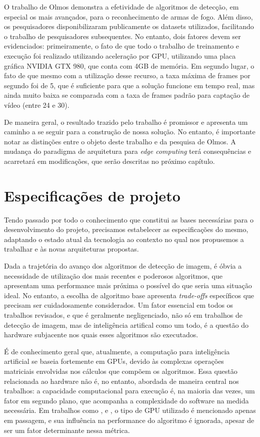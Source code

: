 \documentclass[]{politex}
\begin{document}
O trabalho de Olmos demonstra a efetividade de algoritmos de detecção, em especial os mais avançados, para o reconhecimento de armas de fogo. Além disso, os pesquisadores disponibilizaram publicamente os datasets utilizados, facilitando o trabalho de pesquisadores subsequentes. No entanto, dois fatores devem ser evidenciados: primeiramente, o fato de que todo o trabalho de treinamento e execução foi realizado utilizando aceleração por GPU, utilizando uma placa gráfica NVIDIA GTX 980, que conta com 4GB de memória. Em segundo lugar, o fato de que mesmo com a utilização desse recurso, a taxa máxima de frames por segundo foi de 5, que é suficiente para que a solução funcione em tempo real, mas ainda muito baixa se comparada com a taxa de frames padrão para captação de vídeo (entre 24 e 30).

De maneira geral, o resultado trazido pelo trabalho é promissor e apresenta um caminho a se seguir para a construção de nossa solução. No entanto, é importante notar as distinções entre o objeto deste trabalho e da pesquisa de Olmos. A mudança do paradigma de arquitetura para \textit{edge computing} terá consequências e acarretará em modificações, que serão descritas no próximo capítulo.

\chapter{Especificações de projeto}

Tendo passado por todo o conhecimento que constitui as bases necessárias para o desenvolvimento do projeto, precisamos estabelecer as especificações do mesmo, adaptando o estado atual da tecnologia ao contexto no qual nos propusemos a trabalhar e às novas arquiteturas propostas.

Dada a trajetória do avanço dos algoritmos de detecção de imagem, é óbvia a necessidade de utilização dos mais recentes e poderosos algoritmos, que apresentam uma performance mais próxima o possível do que seria uma situação ideal. No entanto, a escolha de algoritmo base apresenta \textit{trade-offs} específicos que precisam ser cuidadosamente considerados. Um fator essencial em todos os trabalhos revisados, e que é geralmente negligenciado, não só em trabalhos de detecção de imagem, mas de inteligência artifical como um todo, é a questão do hardware subjacente nos quais esses algoritmos são executados.

É de conhecimento geral que, atualmente, a computação para inteligência artificial se baseia fortemente em GPUs, devido às complexas operações matriciais envolvidas nos cálculos que compõem os algoritmos. Essa questão relacionada ao hardware não é, no entanto, abordada de maneira central nos trabalhos: a capacidade computacional para execução é, na maioria das vezes, um fator em segundo plano, que acompanha a complexidade do software na medida necessária. Em trabalhos como \citeyear{fasterrcnn} \citeauthor{fasterrcnn}, \citeyear{yolov3} \citeauthor{yolov3} e \citeyear{olmos1} \citeauthor{olmos1}, o tipo de GPU utilizado é mencionado apenas em passagem, e sua influência na performance do algoritmo é ignorada, apesar de ser um fator determinante nessa métrica.
\end{document}

